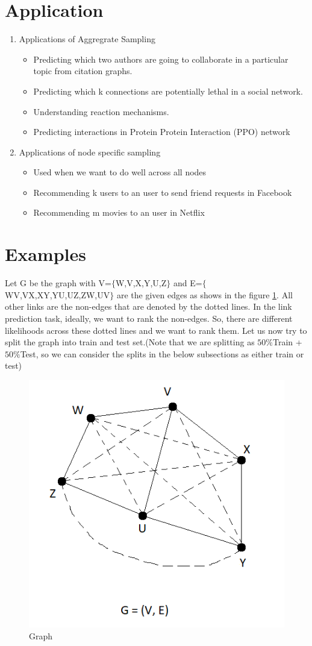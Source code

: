 \documentclass{article}
\begin{document}
\section{Application}\label{sec3}
\begin{enumerate}
    \item Applications of Aggregrate Sampling
    \begin{itemize}
        \item Predicting which two authors are going to collaborate in a particular topic from citation graphs.
        \item Predicting which k connections are potentially lethal in a social network.
        \item Understanding reaction mechanisms.
        \item Predicting interactions in Protein Protein Interaction (PPO) network
    \end{itemize}
    
    \item Applications of node specific sampling
    \begin{itemize}
        \item Used when we want to do well across all nodes
        \item Recommending k users to an user to send friend requests in Facebook
        \item Recommending m movies to an user in Netflix
    \end{itemize}
\end{enumerate}

\section{Examples}\label{sec4}
Let G be the graph with V=$\{$W,V,X,Y,U,Z$\}$ and E=$\{$WV,VX,XY,YU,UZ,ZW,UV$\}$ are the given edges as shows in the figure \ref{fig:Graph}. All other links are the non-edges that are denoted by the dotted lines. In the link prediction task, ideally, we want to rank the non-edges. So, there are different likelihoods across these dotted lines and we want to rank them. Let us now try to split the graph into train and test set.(Note that we are splitting as $50\%$Train + $50\%$Test, so we can consider the splits in the below subsections as either train or test)
\begin{figure}[h!]
    \centering
    \includegraphics[width=0.3\linewidth]{graph.png}
    \caption{Graph}
    \label{fig:Graph}
\end{figure}
\end{document}
